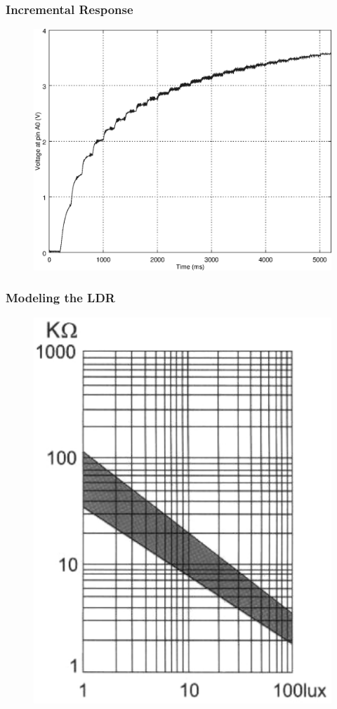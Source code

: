 \subsubsection{Incremental Response}
\label{sub:IncrementalResponse}

\begin{figure}[h]
    \centering
    \includegraphics[width=.85\textwidth]{img/incstep_response}
    \caption{}
    \label{fig:incstep_response}
\end{figure}

\subsubsection{Modeling the LDR}
\label{subsubsec:LDR_model}

\begin{figure}[h]
    \centering
    \includegraphics[width=.4\textwidth]{img/LDR_datasheet}
    \caption{}
    \label{fig:LDR_datasheet}
\end{figure}

